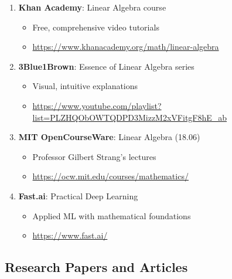 \documentclass[11pt,a4paper]{article}
\begin{document}
\begin{enumerate}
    \item \textbf{Khan Academy}: Linear Algebra course
    \begin{itemize}
        \item Free, comprehensive video tutorials
        \item \url{https://www.khanacademy.org/math/linear-algebra}
    \end{itemize}
    
    \item \textbf{3Blue1Brown}: Essence of Linear Algebra series
    \begin{itemize}
        \item Visual, intuitive explanations
        \item \url{https://www.youtube.com/playlist?list=PLZHQObOWTQDPD3MizzM2xVFitgF8hE_ab}
    \end{itemize}
    
    \item \textbf{MIT OpenCourseWare}: Linear Algebra (18.06)
    \begin{itemize}
        \item Professor Gilbert Strang's lectures
        \item \url{https://ocw.mit.edu/courses/mathematics/}
    \end{itemize}
    
    \item \textbf{Fast.ai}: Practical Deep Learning
    \begin{itemize}
        \item Applied ML with mathematical foundations
        \item \url{https://www.fast.ai/}
    \end{itemize}
\end{enumerate}

\subsection{Research Papers and Articles}
\end{document}
